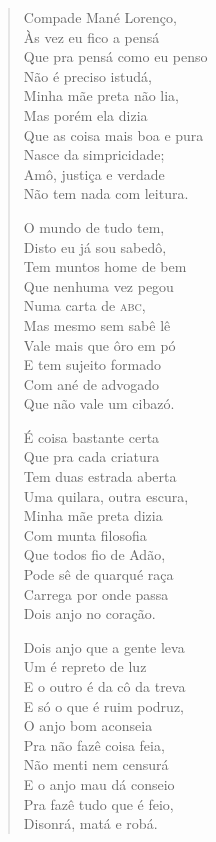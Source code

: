 \begin{verse}
Compade Mané Lorenço,\\
Às vez eu fico a pensá\\
Que pra pensá como eu penso\\
Não é preciso istudá,\\
Minha mãe preta não lia,\\
Mas porém ela dizia\\
Que as coisa mais boa e pura\\
Nasce da simpricidade;\\
Amô, justiça e verdade\\
Não tem nada com leitura.

O mundo de tudo tem,\\
Disto eu já sou sabedô,\\
Tem muntos home de bem\\
Que nenhuma vez pegou\\
Numa carta de \textsc{abc},\\
Mas mesmo sem sabê lê\\
Vale mais que ôro em pó\\
E tem sujeito formado\\
Com ané de advogado\\
Que não vale um cibazó.

É coisa bastante certa\\
Que pra cada criatura\\
Tem duas estrada aberta\\
Uma quilara, outra escura,\\
Minha mãe preta dizia\\
Com munta filosofia\\
Que todos fio de Adão,\\
Pode sê de quarqué raça\\
Carrega por onde passa\\
Dois anjo no coração.

Dois anjo que a gente leva\\
Um é repreto de luz\\
E o outro é da cô da treva\\
E só o que é ruim podruz,\\
O anjo bom aconseia\\
Pra não fazê coisa feia,\\
Não menti nem censurá\\
E o anjo mau dá conseio\\
Pra fazê tudo que é feio,\\
Disonrá, matá e robá.


\end{verse}
